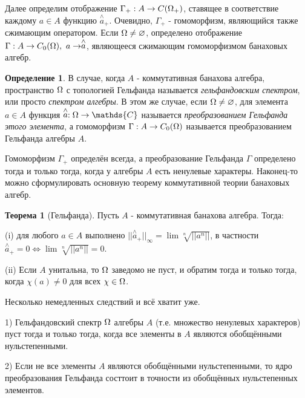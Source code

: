 \documentclass[12pt]{extarticle}
\theoremstyle{definition}
\newtheorem{theorem}{\indent Теорема}[section]
\newtheorem{definition}{\indent Определение}[section]
\begin{document}
    Далее определим отображение $\Gamma_+: A \rightarrow C(\ohm_+)$, ставящее в соответствие каждому $a \in A$ функцию $\stackrel{\wedge}{a}_+$. Очевидно, $\Gamma_+$ - гомоморфизм, являющийся также сжимающим оператором. Если $\ohm \neq \varnothing$, определено отображение  $\Gamma: A \rightarrow C_0(\ohm),\ a \rightarrow \stackrel{\wedge}{a}$, являющееся сжимающим гомоморфизмом банаховых алгебр.
    
    \begin{definition}
    В случае, когда $A$ - коммутативная банахова алгебра, пространство $\ohm$ с топологией Гельфанда называется \textit{гельфандовским спектром}, или просто \textit{спектром алгебры}. В этом же случае, если $\ohm \neq \varnothing$, для элемента $a \in A$ функция $\stackrel{\wedge}{a}: \ohm \rightarrow \mathds{C}$ называется \textit{преобразованием Гельфанда этого элемента}, а гомоморфизм $\Gamma: A \rightarrow C_0(\ohm)$ называется преобразованием Гельфанда алгебры $A$.
    \end{definition}
    
    Гомоморфизм $\Gamma_+$ определён всегда, а преобразование Гельфанда $\Gamma$ определено тогда и только тогда, когда у алгебры $A$ есть ненулевые характеры. Наконец-то можно сформулировать основную теорему коммутативной теории банаховых алгебр. 
    
     \begin{theorem}[Гельфанда]\label{th:Gelfand}
     Пусть $A$ - коммутативная банахова алгебра. Тогда: 
     
     (i) для любого $a \in A$ выполнено $||\stackrel{\wedge}{a}_+||_{\infty} = \lim \sqrt[n]{||a^n||}$, в частности $\stackrel{\wedge}{a}_+ = 0 \Leftrightarrow \lim \sqrt[n]{||a^n||} = 0$.
     
     (ii) Если $A$ унитальна, то $\ohm$ заведомо не пуст, и обратим тогда и только тогда, когда $\chi(a) \neq 0$ для всех $\chi \in \ohm$.
      \end{theorem}
      
      Несколько немедленных следствий и всё хватит уже.
      
      1) Гельфандовский спектр $\ohm$ алгебры $A$ (т.е. множество ненулевых характеров) пуст тогда и только тогда, когда все элементы в $A$ являются обобщёнными нульстепенными. 
      
      2) Если не все элементы $A$ являются обобщёнными нульстепенными, то ядро преобразования Гельфанда состтоит в точности из обобщённых нульстепенных элементов.\\
      
\end{document}
